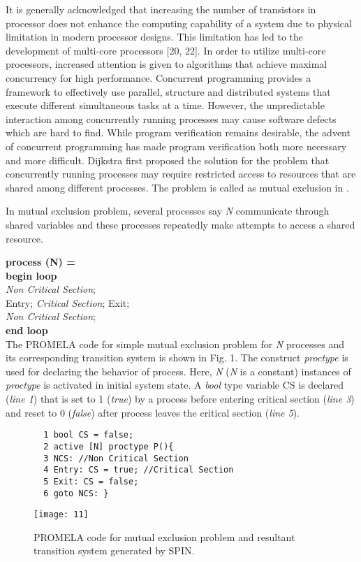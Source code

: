\documentclass[conference]{IEEEtran}
\begin{document}
It is generally acknowledged that increasing the number of transistors in processor does not enhance the computing capability of a system due
to physical limitation in modern processor designs. This limitation has led to the development of multi-core processors [20, 22]. In order to 
utilize multi-core processors, increased attention is given to algorithms that achieve maximal concurrency for high performance. Concurrent
programming provides a framework to effectively use parallel, structure and distributed systems that execute different simultaneous tasks at a 
time. However, the unpredictable interaction among concurrently running processes may cause software defects which are hard to find. While program 
verification remains desirable, the advent of concurrent programming has made program verification both more necessary and more difficult. 
Dijkstra \cite{8} first proposed the solution for the problem that concurrently running processes may require restricted access to resources that are 
shared among different processes. The problem is called as mutual exclusion in \cite{9}. 

In mutual exclusion problem, several processes say \textit{N} communicate through shared variables and these processes repeatedly make attempts 
to access a shared resource.

 \textbf{process (N) =}\\
 \hspace*{.5cm}\textbf{begin loop}\\
 \hspace*{.6cm}\textit{Non Critical Section};\\
 \hspace*{.7cm}Entry; \textit{Critical Section}; Exit;\\
\hspace*{.6cm}\textit{Non Critical Section};\\
\hspace*{.5cm}\textbf{end loop}\\

 The PROMELA code for simple mutual exclusion problem for \textit{N} processes and its corresponding transition system is shown in Fig. 1. 
 The construct \textit{proctype} is used for declaring the behavior of process. Here, \textit{N} (\textit{N}  is a constant) instances of 
 \textit{proctype} is activated in initial system state. 
 A \textit{bool} type variable CS is declared (\textit{line 1}) that is set to 1 (\textit{true}) by a process before entering critical section 
 (\textit{line 3}) and reset to 0 (\textit{false}) after process leaves the critical section (\textit{line 5}).
\begin{figure}[!ht]
{\small 
\begin{verbatim}
  1 bool CS = false;
  2 active [N] proctype P(){
  3 NCS: //Non Critical Section 
  4 Entry: CS = true; //Critical Section
  5 Exit: CS = false;
  6 goto NCS: }      
\end{verbatim}}\vspace{-3mm}
\centering\texttt{[image: 11]}
\caption{PROMELA code for mutual exclusion problem and resultant transition system generated by SPIN.} 
\end{figure}
\end{document}
